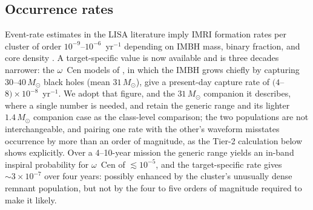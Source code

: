 \documentclass[11pt]{article}
\newcommand{\msun}{\ensuremath{M_\odot}}
\newcommand{\ocen}{\ensuremath{\omega}~Cen}
\begin{document}
\subsection{Occurrence rates}

Event-rate estimates in the LISA literature imply IMRI formation rates per cluster of order $10^{-9}$--$10^{-6}$~yr$^{-1}$ depending on IMBH mass, binary fraction, and core density \citep{Mandel2008,AmaroSeoane2018,Fragione2018,ArcaSedda2021}. A target-specific value is now available and is three decades narrower: the \ocen{} models of \citet{GonzalezPrieto2025}, in which the IMBH grows chiefly by capturing $30$--$40\,\msun$ black holes (mean $31\,\msun$), give a present-day capture rate of $(4$--$8)\times10^{-8}$~yr$^{-1}$. We adopt that figure, and the $31\,\msun$ companion it describes, where a single number is needed, and retain the generic range and its lighter $1.4\,\msun$ companion case as the class-level comparison; the two populations are not interchangeable, and pairing one rate with the other's waveform misstates occurrence by more than an order of magnitude, as the Tier-2 calculation below shows explicitly. Over a 4--10-year mission the generic range yields an in-band inspiral probability for \ocen{} of $\lesssim 10^{-5}$, and the target-specific rate gives $\sim 3\times10^{-7}$ over four years: possibly enhanced by the cluster's unusually dense remnant population, but not by the four to five orders of magnitude required to make it likely.
\end{document}
